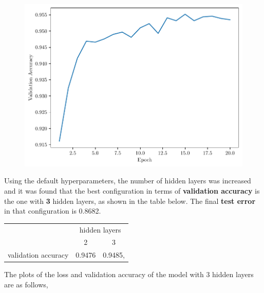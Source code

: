 \begin{questions}
        \begin{figure}[H]
            \centering
            \includegraphics[scale = 0.75]{feedforward-validation-accuracy-0.1-100-1-0.3-relu-sgd-16.pdf}
        \end{figure}
        \question %

        Using the default hyperparameters, the number of hidden layers was increased
        and it was found that the best configuration in terms of \textbf{validation accuracy} is the one with \textbf{3} hidden layers,
        as shown in the table below. The final \textbf{test error} in that configuration is 0.8682.

        \begin{table}[h!]
            \centering
            \begin{tabular}{l|cc}
                 & \multicolumn{2}{c}{hidden layers}     \\ \cline{2-3} 
                 & \multicolumn{1}{c|}{2}      & 3       \\ \hline
                    \multicolumn{1}{c|}{validation accuracy} & \multicolumn{1}{c|}{0.9476} & 0.9485,
            \end{tabular}
        \end{table}

        The plots of the loss and validation accuracy of the model with 3 hidden layers are as follows,


\end{questions}
